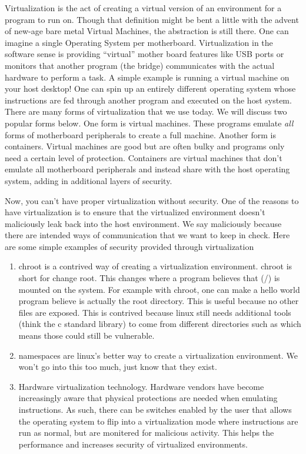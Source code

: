 Virtualization is the act of creating a virtual version of an environment for a program to run on.
Though that definition might be bent a little with the advent of new-age bare metal Virtual Machines, the abstraction is still there.
One can imagine a single Operating System per motherboard.
Virtualization in the software sense is providing ``virtual'' mother board features like USB ports or monitors that another program (the bridge) communicates with the actual hardware to perform a task.
A simple example is running a virtual machine on your host desktop!
One can spin up an entirely different operating system whose instructions are fed through another program and executed on the host system.
There are many forms of virtualization that we use today. We will discuss two popular forms below.
One form is virtual machines.
These programs emulate \textit{all} forms of motherboard peripherals to create a full machine.
Another form is containers.
Virtual machines are good but are often bulky and programs only need a certain level of protection.
Containers are virtual machines that don't emulate all motherboard peripherals and instead share with the host operating system, adding in additional layers of security.

Now, you can't have proper virtualization without security.
One of the reasons to have virtualization is to ensure that the virtualized environment doesn't maliciously leak back into the host environment.
We say maliciously because there are intended ways of communication that we want to keep in check.
Here are some simple examples of security provided through virtualization

\begin{enumerate}
\item chroot is a contrived way of creating a virtualization environment.
  chroot is short for change root.
  This changes where a program believes that (/) is mounted on the system.
  For example with chroot, one can make a hello world program believe  is actually the root directory.
  This is useful because no other files are exposed.
  This is contrived because linux still needs additional tools (think the c standard library) to come from different directories such as  which means those could still be vulnerable.
\item namespaces are linux's better way to create a virtualization environment.
  We won't go into this too much, just know that they exist.
\item Hardware virtualization technology.
  Hardware vendors have become increasingly aware that physical protections are needed when emulating instructions.
  As such, there can be switches enabled by the user that allows the operating system to flip into a virtualization mode where instructions are run as normal, but are monitered for malicious activity.
  This helps the performance and increases security of virtualized environments.
\end{enumerate}

